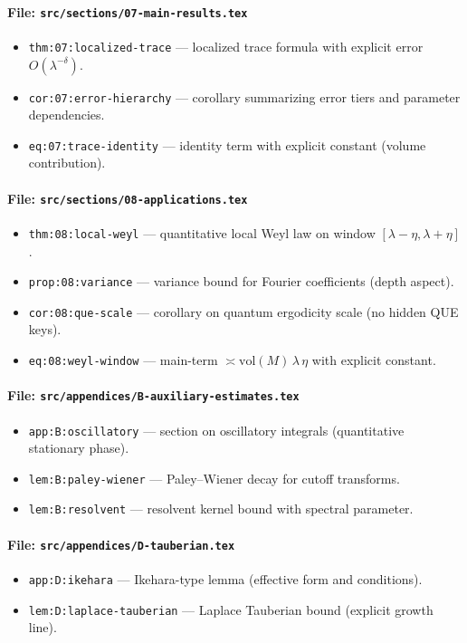 \paragraph{File: \texttt{src/sections/07-main-results.tex}}
\begin{itemize}
  \item \texttt{thm:07:localized-trace} — localized trace formula with explicit error $O(\lambda^{-\delta})$.
  \item \texttt{cor:07:error-hierarchy} — corollary summarizing error tiers and parameter dependencies.
  \item \texttt{eq:07:trace-identity} — identity term with explicit constant (volume contribution).
\end{itemize}

\paragraph{File: \texttt{src/sections/08-applications.tex}}
\begin{itemize}
  \item \texttt{thm:08:local-weyl} — quantitative local Weyl law on window $[\lambda-\eta,\lambda+\eta]$.
  \item \texttt{prop:08:variance} — variance bound for Fourier coefficients (depth aspect).
  \item \texttt{cor:08:que-scale} — corollary on quantum ergodicity scale (no hidden QUE keys).
  \item \texttt{eq:08:weyl-window} — main-term $\asymp \mathrm{vol}(M)\,\lambda\,\eta$ with explicit constant.
\end{itemize}

\paragraph{File: \texttt{src/appendices/B-auxiliary-estimates.tex}}
\begin{itemize}
  \item \texttt{app:B:oscillatory} — section on oscillatory integrals (quantitative stationary phase).
  \item \texttt{lem:B:paley-wiener} — Paley–Wiener decay for cutoff transforms.
  \item \texttt{lem:B:resolvent} — resolvent kernel bound with spectral parameter.
\end{itemize}

\paragraph{File: \texttt{src/appendices/D-tauberian.tex}}
\begin{itemize}
  \item \texttt{app:D:ikehara} — Ikehara-type lemma (effective form and conditions).
  \item \texttt{lem:D:laplace-tauberian} — Laplace Tauberian bound (explicit growth line).
\end{itemize}

